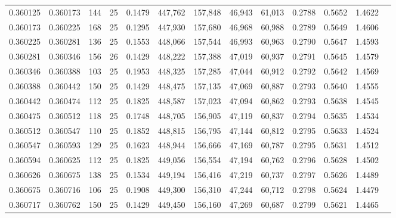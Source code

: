 \begin{tabular}{rrrrrrrrrrrrr}
0.360125 & 0.360173 &   144 &  25 &                                     0.1479 & 447,762 & 157,848 &  46,943 &  61,013 & 0.2788 & 0.5652 & 1.4622 \\
0.360173 & 0.360225 &   168 &  25 &                                     0.1295 & 447,930 & 157,680 &  46,968 &  60,988 & 0.2789 & 0.5649 & 1.4606 \\
0.360225 & 0.360281 &   136 &  25 &                                     0.1553 & 448,066 & 157,544 &  46,993 &  60,963 & 0.2790 & 0.5647 & 1.4593 \\
0.360281 & 0.360346 &   156 &  26 &                                     0.1429 & 448,222 & 157,388 &  47,019 &  60,937 & 0.2791 & 0.5645 & 1.4579 \\
0.360346 & 0.360388 &   103 &  25 &                                     0.1953 & 448,325 & 157,285 &  47,044 &  60,912 & 0.2792 & 0.5642 & 1.4569 \\
0.360388 & 0.360442 &   150 &  25 &                                     0.1429 & 448,475 & 157,135 &  47,069 &  60,887 & 0.2793 & 0.5640 & 1.4555 \\
0.360442 & 0.360474 &   112 &  25 &                                     0.1825 & 448,587 & 157,023 &  47,094 &  60,862 & 0.2793 & 0.5638 & 1.4545 \\
0.360475 & 0.360512 &   118 &  25 &                                     0.1748 & 448,705 & 156,905 &  47,119 &  60,837 & 0.2794 & 0.5635 & 1.4534 \\
0.360512 & 0.360547 &   110 &  25 &                                     0.1852 & 448,815 & 156,795 &  47,144 &  60,812 & 0.2795 & 0.5633 & 1.4524 \\
0.360547 & 0.360593 &   129 &  25 &                                     0.1623 & 448,944 & 156,666 &  47,169 &  60,787 & 0.2795 & 0.5631 & 1.4512 \\
0.360594 & 0.360625 &   112 &  25 &                                     0.1825 & 449,056 & 156,554 &  47,194 &  60,762 & 0.2796 & 0.5628 & 1.4502 \\
0.360626 & 0.360675 &   138 &  25 &                                     0.1534 & 449,194 & 156,416 &  47,219 &  60,737 & 0.2797 & 0.5626 & 1.4489 \\
0.360675 & 0.360716 &   106 &  25 &                                     0.1908 & 449,300 & 156,310 &  47,244 &  60,712 & 0.2798 & 0.5624 & 1.4479 \\
0.360717 & 0.360762 &   150 &  25 &                                     0.1429 & 449,450 & 156,160 &  47,269 &  60,687 & 0.2799 & 0.5621 & 1.4465 \\

\end{tabular}

